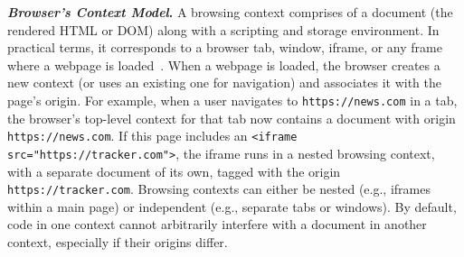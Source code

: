 \noindent \textbf{\textit{Browser’s Context Model}.} 
%
A browsing context comprises of a document (the rendered HTML or DOM) along with a scripting and storage environment. %
%
In practical terms, it corresponds to a browser tab, window, iframe, or any frame where a webpage is loaded~\cite{MDNBrowsingContext}. 
%
When a webpage is loaded, the browser creates a new context (or uses an existing one for navigation) and associates it with the page’s origin. 
%
For example, when a user navigates to \texttt{https://news.com} in a tab, the browser’s top-level context for that tab now contains a document with origin \texttt{https://news.com}.
%
If this page includes an \texttt{<iframe src="https://tracker.com">}, the iframe runs in a nested browsing context, with a separate document of its own, tagged with the origin \texttt{https://tracker.com}.
%
Browsing contexts can either be nested (e.g., iframes within a main page) or independent (e.g., separate tabs or windows). 
%
By default, code in one context cannot arbitrarily interfere with a document in another context, especially if their origins differ.
%



